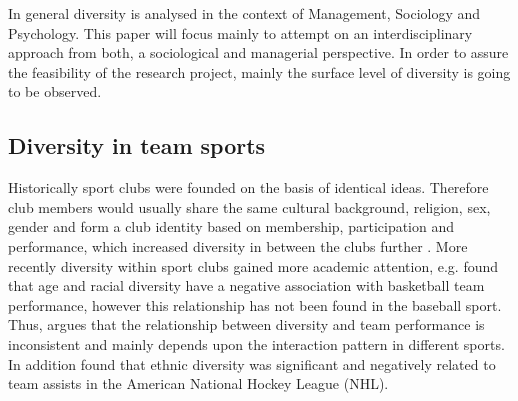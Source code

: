 \documentclass[	
	12pt, %
	a4paper, %
]{scrartcl}\usepackage[]{graphicx}\usepackage[]{color}
\begin{document}
In general diversity is analysed in the context of Management, Sociology and Psychology. This paper will focus mainly to attempt on an interdisciplinary approach from both, a sociological and managerial perspective. In order to assure the feasibility of the research project, mainly the surface level of diversity is going to be observed.

\subsection{Diversity in team sports}

Historically sport clubs were founded on the basis of identical ideas. Therefore club members would usually share the same cultural background, religion, sex, gender and form a club identity based on membership, participation and performance, which increased diversity in between the clubs further \cite{Anthonissen2001, Day1981}.
More recently diversity within sport clubs gained more academic attention, e.g.  found that age and racial diversity have a negative association with basketball team performance, however this relationship has not been found in the baseball sport. Thus,  argues that the relationship between diversity and team performance is inconsistent and mainly depends upon the interaction pattern in different sports. In addition  found that ethnic diversity was significant and negatively related to team assists in the American National Hockey League (NHL). %
\end{document}
